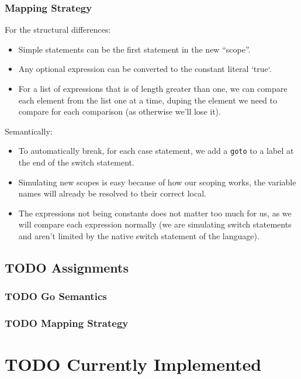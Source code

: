 \documentclass[11pt]{article}
\begin{document}
\subsubsection{Mapping Strategy}
\label{sec:org8383ab2}
For the structural differences:
\begin{itemize}
\item Simple statements can be the first statement in the new ``scope''.
\item Any optional expression can be converted to the constant literal `true`.
\item For a list of expressions that is of length greater than one, we
can compare each element from the list one at a time, duping the
element we need to compare for each comparison (as otherwise
we'll lose it).
\end{itemize}
Semantically:
\begin{itemize}
\item To automatically break, for each case statement, we add a \texttt{goto}
to a label at the end of the switch statement.
\item Simulating new scopes is easy because of how our scoping works,
the variable names will already be resolved to their correct local.
\item The expressions not being constants does not matter too much for
us, as we will compare each expression normally (we are
simulating switch statements and aren't limited by the native
switch statement of the language).
\end{itemize}
\subsection{{\bfseries\sffamily TODO} Assignments}
\label{sec:orga8ba893}
\subsubsection{{\bfseries\sffamily TODO} Go Semantics}
\label{sec:org840a1c2}
\subsubsection{{\bfseries\sffamily TODO} Mapping Strategy}
\label{sec:orgb1d24f3}
\section{{\bfseries\sffamily TODO} Currently Implemented}
\label{sec:org0570f60}
\end{document}
